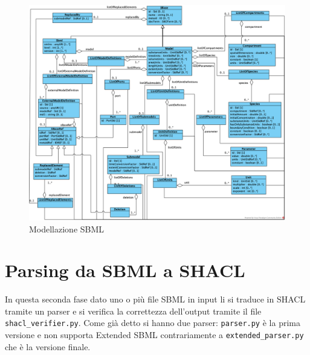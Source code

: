 \documentclass{article}
\begin{document}






\begin{figure}
    \caption{Modellazione SBML}
    \label{fig:diagram}
    \includegraphics[scale=0.6]{images/diagram.png}
\end{figure}

\clearpage
\section{Parsing da SBML a SHACL}

In questa seconda fase dato uno o più file SBML in input li si traduce in SHACL tramite un parser e si verifica la correttezza dell'output tramite il file \texttt{shacl\_verifier.py}. Come già detto si hanno due parser: \texttt{parser.py} è la prima versione e non supporta Extended SBML contrariamente a \texttt{extended\_parser.py} che è la versione finale. 
\end{document}
